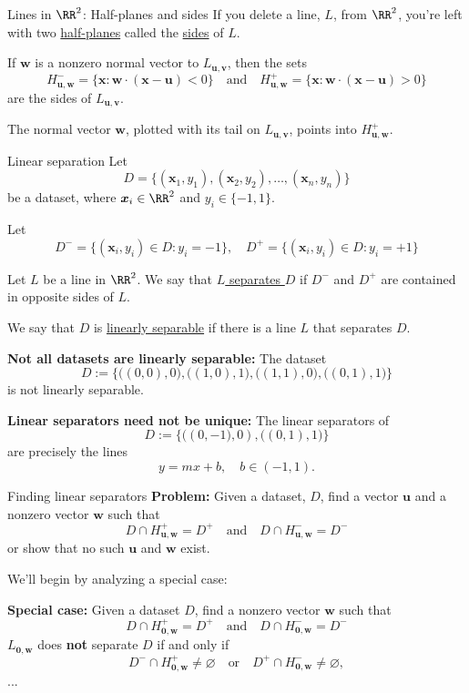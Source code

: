 \documentclass{beamer}
\newcommand{\vu}{\boldsymbol{u}}
\newcommand{\vv}{\boldsymbol{v}}
\renewcommand{\vw}{\boldsymbol{w}}
\renewcommand{\vx}{\boldsymbol{x}}
\newcommand{\vzero}{\boldsymbol{0}}
\begin{document}
\begin{frame}{Lines in $\RR^2$: Half-planes and sides}
    If you delete a line, $L$, from $\RR^2$, you're left with two \underline{half-planes} called the \underline{sides} of $L$.

    If $\vw$ is a nonzero normal vector to $L_{\vu, \vv}$, then the sets
    \[
        H_{\vu, \vw}^- =
        \{\vx : \vw\cdot(\vx - \vu) < 0\}
        \quad\text{and}\quad
        H_{\vu, \vw}^+ = \{\vx : \vw\cdot(\vx - \vu) > 0\}
    \]
    are the sides of $L_{\vu, \vv}$.

    The normal vector $\vw$, plotted with its tail on $L_{\vu, \vv}$, points into $H_{\vu, \vw}^+$.
\end{frame}

\begin{frame}{Linear separation}
    Let
    \[
        D=\big\{(\vx_1, y_1), (\vx_2, y_2),\ldots, (\vx_n, y_n)\big\}
    \]
    be a dataset, where $\vx_i\in \RR^2$ and $y_i\in \{-1, 1\}$.

    Let
    \[
        D^-=\big\{(\vx_i, y_i)\in D : y_i=-1\big\},
        \quad
        D^+=\big\{(\vx_i, y_i)\in D : y_i=+1\big\}
    \]

    Let $L$ be a line in $\RR^2$. We say that \underline{$L$ separates $D$} if $D^-$ and $D^+$
    are contained in opposite sides of $L$.

    We say that $D$ is \underline{linearly separable} if there is a line $L$ that separates $D$.
\end{frame}

\begin{frame}{}

    \textbf{Not all datasets are linearly separable:} The dataset
    \[
        D := \Big\{\big((0, 0), 0\big), \big((1, 0), 1\big), 
        \big((1, 1), 0\big), \big((0, 1), 1\big) \Big\}
    \]
    is not linearly separable.

    \textbf{Linear separators need not be unique:} The linear separators of
    \[
        D := \Big\{\big((0, -1\big), 0), \big((0, 1), 1\big) \Big\}
    \]
    are precisely the lines
    \[
        y=mx+b,\quad b\in (-1, 1).
    \]


    
\end{frame}

\begin{frame}{Finding linear separators}
    \textbf{Problem:}
    Given a dataset, $D$, find a vector $\vu$ and a nonzero vector $\vw$
    such that
    \[
        D\cap H_{\vu, \vw}^+ = D^+
        \quad\text{and}\quad
        D\cap H_{\vu, \vw}^- = D^-
    \]
    or show that no such $\vu$ and $\vw$ exist.

    We'll begin by analyzing a special case:

    \textbf{Special case:} Given a dataset $D$, find a nonzero vector $\vw$
    such that
    \[
        D\cap H_{\vzero, \vw}^+ = D^+
        \quad\text{and}\quad
        D\cap H_{\vzero, \vw}^- = D^-
    \]
    $L_{\vzero, \vw}$ does \textbf{not} separate $D$ if and only if
    \[
        D^-\cap H_{\vzero, \vw}^+\neq\varnothing
        \quad\text{or}\quad
        D^+\cap H_{\vzero, \vw}^-\neq\varnothing,
    \]
    ...
\end{frame}
\end{document}
